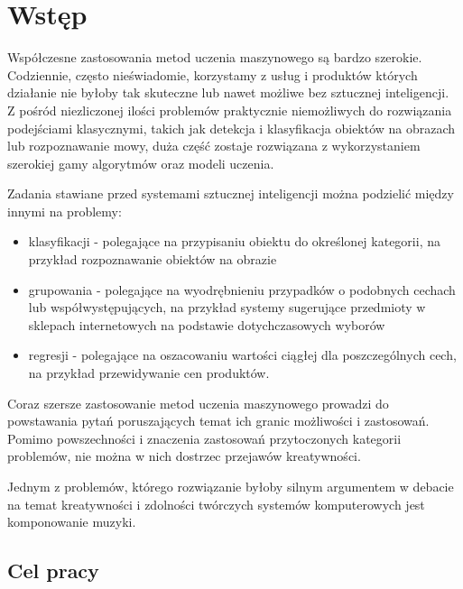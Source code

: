 
\chapter{Wstęp}\label{chap:intro}
{
    Współczesne zastosowania metod uczenia maszynowego są bardzo szerokie. Codziennie, często nieświadomie,
    korzystamy z\,\,usług i\,\,produktów których działanie nie byłoby tak skuteczne lub nawet możliwe bez sztucznej inteligencji.
    Z\,\,pośród niezliczonej ilości problemów praktycznie niemożliwych do rozwiązania podejściami klasycznymi, 
    takich jak detekcja i\,\,klasyfikacja obiektów na obrazach lub rozpoznawanie mowy,
    duża część zostaje rozwiązana z\,\,wykorzystaniem szerokiej gamy algorytmów oraz modeli uczenia.

    Zadania stawiane przed systemami sztucznej inteligencji można podzielić między innymi na problemy:
    \begin{itemize}
        \setlength\itemsep{-0.5em}
        \item klasyfikacji - polegające na przypisaniu obiektu do określonej kategorii, 
        na przykład rozpoznawanie obiektów na obrazie 
        \item grupowania - polegające na wyodrębnieniu przypadków o\,\,podobnych cechach 
        lub współwystępujących, na przykład systemy sugerujące przedmioty w\,\,sklepach internetowych na podstawie dotychczasowych wyborów
        \item regresji - polegające na oszacowaniu wartości ciągłej dla poszczególnych cech, 
        na przykład przewidywanie cen produktów.
    \end{itemize}

    \pagebreak

    Coraz szersze zastosowanie metod uczenia maszynowego prowadzi do powstawania pytań poruszających temat 
    ich granic możliwości i\,\,zastosowań.
    Pomimo powszechności i\,\,znaczenia zastosowań przytoczonych kategorii problemów, nie można w\,\,nich dostrzec przejawów kreatywności.
    
    Jednym z\,\,problemów, którego rozwiązanie byłoby silnym argumentem w\,\,debacie na temat kreatywności i\,\,zdolności twórczych
    systemów komputerowych jest komponowanie muzyki.

    \section{Cel pracy}
    {

}}
